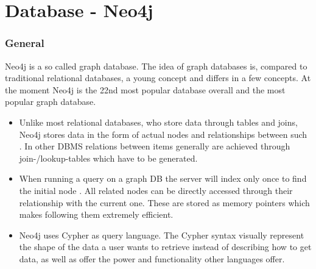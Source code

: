 \section{Database - Neo4j}
\subsubsection{General}
Neo4j is a so called graph database. The idea of graph databases is, compared to traditional relational databases, a young concept and differs in a few concepts. At the moment Neo4j is the 22nd most popular database overall \cite{DbEnginesGeneral} and the most popular graph database. \cite{DbEnginesGraph}

\begin{itemize}
\item Unlike most relational databases, who store data through tables and joins, Neo4j stores data in the form of actual nodes and relationships between such \cite{Neo4jDevGuides}. In other DBMS relations between items generally are achieved through join-/lookup-tables which have to be generated. \cite{RelVsGraph}

\item When running a query on a graph DB the server will index only once to find the initial node \citep[minute 32]{NeoInternals}. All related nodes can be directly accessed through their relationship with the current one. \cite{WhatGraphDB} These are stored as memory pointers which makes following them extremely efficient.

\item Neo4j uses Cypher as query language. The Cypher syntax visually represent the shape of the data a user wants to retrieve instead of describing how to get data, as well as offer the power and functionality other languages offer. \cite{Neo4jCypher} 
\end{itemize}

